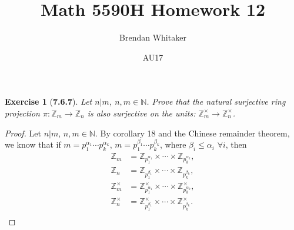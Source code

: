 \documentclass[10pt,oneside,reqno]{amsart}
\theoremstyle{plain}
\newtheorem*{e}{Exercise}
\theoremstyle{definition}
\begin{document}
\title{Math 5590H Homework 12}

\date{AU17}

\author[Brendan Whitaker]{Brendan Whitaker}

\maketitle

\begin{e}[\textbf{7.6.7}]
Let $n|m$, $n,m \in \mathbb{N}$. Prove that the natural surjective ring projection $\pi: \mathbb{Z}_m \to \mathbb{Z}_n$ is also surjective on the units: $\mathbb{Z}_m^{\times} \to \mathbb{Z}_n^{\times}$. 
\end{e}

\begin{proof}
Let $n|m$, $n,m \in \mathbb{N}$. By corollary 18 and the Chinese remainder theorem, we know that if $m = p_1^{\alpha_1} \cdots p_k^{\alpha_k}$, $m = p_1^{\beta_1} \cdots p_k^{\beta_k}$, where $\beta_i \leq \alpha_i$ $\forall i$, then 
\begin{equation}
\begin{aligned}
\mathbb{Z}_m &= \mathbb{Z}_{p_1^{\alpha_1}} \times \cdots \times \mathbb{Z}_{p_k^{\alpha_k}},\\
\mathbb{Z}_n &= \mathbb{Z}_{p_1^{\beta_1}} \times \cdots \times \mathbb{Z}_{p_k^{\beta_k}},\\
\mathbb{Z}_m^{\times} &= \mathbb{Z}_{p_1^{\alpha_1}}^{\times} \times \cdots \times \mathbb{Z}_{p_k^{\alpha_k}}^{\times},\\
\mathbb{Z}_n^{\times} &= \mathbb{Z}_{p_1^{\beta_1}}^{\times} \times \cdots \times \mathbb{Z}_{p_k^{\beta_k}}^{\times}.\\
\end{aligned}
\end{equation}

\end{proof}
\end{document}

